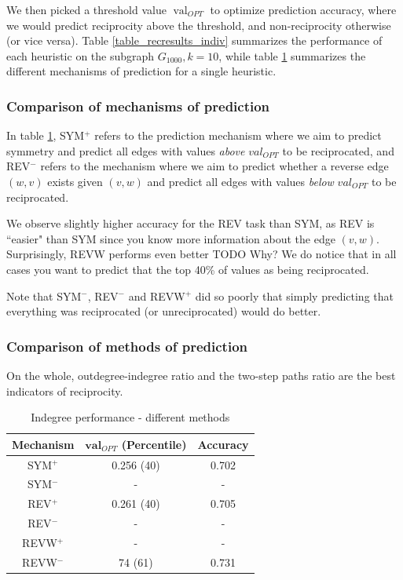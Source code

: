 \documentclass[conference]{IEEEtran}
\begin{document}
We then picked a threshold value $\operatorname{val}_{OPT}$ to optimize prediction accuracy, where we would predict reciprocity above the threshold, and non-reciprocity otherwise (or vice versa). Table \ref{table_recresults_indiv} summarizes the performance of each heuristic on the subgraph $G_{1000}, k=10$, while table \ref{table_recresults_indeg} summarizes the different mechanisms of prediction for a single heuristic. 

\subsubsection{Comparison of mechanisms of prediction}

In table \ref{table_recresults_indeg}, SYM$^+$ refers to the prediction mechanism where we aim to predict symmetry and predict all edges with values \emph{above} $val_{OPT}$ to be reciprocated, and REV$^-$ refers to the mechanism where we aim to predict whether a reverse edge $(w,v)$ exists given $(v,w)$ and predict all edges with values \emph{below} $val_{OPT}$ to be reciprocated. 

We observe slightly higher accuracy for the REV task than SYM, as REV is ``easier" than SYM since you know more information about the edge $(v,w)$. Surprisingly, REVW performs even better TODO Why? We do notice that in all cases you want to predict that the top 40\% of values as being reciprocated. 

Note that SYM$^-$, REV$^-$ and REVW$^+$ did so poorly that simply predicting that everything was reciprocated (or unreciprocated) would do better.

\subsubsection{Comparison of methods of prediction}
On the whole, outdegree-indegree ratio and the two-step paths ratio are the best indicators of reciprocity.

\begin{table}[!t]
\renewcommand{\arraystretch}{1.3}
\caption{Indegree performance - different methods}
\label{table_recresults_indeg}
\centering
\begin{tabular}{|c||c|c|}
\hline
\bf{Mechanism} & $\mathbf{val}_{OPT}$ (Percentile) & \bf{Accuracy} \\
\hline
SYM$^+$ & 0.256 (40) & 0.702 \\
SYM$^-$ & - & - \\
REV$^+$ & 0.261 (40) & 0.705 \\
REV$^-$ & - & - \\
REVW$^+$ & - & - \\
REVW$^-$ & 74 (61) & 0.731 \\
\hline
\end{tabular}
\end{table}
\end{document}
